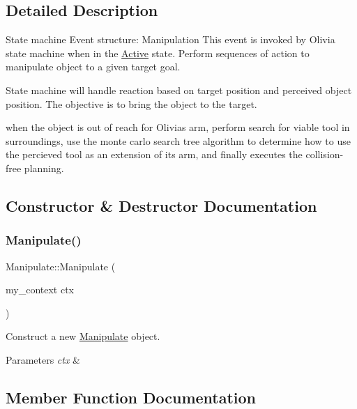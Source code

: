 \subsection{Detailed Description}
State machine Event structure\+: Manipulation This event is invoked by Olivia state machine when in the \hyperlink{structActive}{Active} state. Perform sequences of action to manipulate object to a given target goal. 

State machine will handle reaction based on target position and perceived object position. The objective is to bring the object to the target.

when the object is out of reach for Olivia\textquotesingle{}s arm, perform search for viable tool in surroundings, use the monte carlo search tree algorithm to determine how to use the percieved tool as an extension of its arm, and finally executes the collision-\/free planning. 

\subsection{Constructor \& Destructor Documentation}
\mbox{\label{structManipulate_ade8f8feaa7693b19b0038f3099218dec}} 
\subsubsection{\texorpdfstring{Manipulate()}{Manipulate()}}
{\footnotesize\ttfamily Manipulate\+::\+Manipulate (\begin{DoxyParamCaption}\item[{my\+\_\+context}]{ctx }\end{DoxyParamCaption})}



Construct a new \hyperlink{structManipulate}{Manipulate} object. 


\begin{DoxyParams}{Parameters}
{\em ctx} & \\
\hline
\end{DoxyParams}


\subsection{Member Function Documentation}
\mbox{\label{structManipulate_a56189f1ea0370b1e8d680afe6cd886ea}} 
